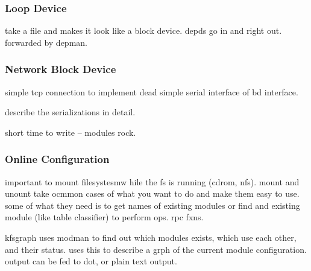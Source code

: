 \subsubsection{Loop Device}

take a file and makes it look like a block device. depds go in and
right out. forwarded by depman.

\subsubsection{Network Block Device}

simple tcp connection to implement dead simple serial interface of bd
interface.

describe the serializations in detail.

short time to write -- modules rock.

\subsubsection{Online Configuration}

important to mount filesystesmw hile the fs is running (cdrom,
nfs). mount and unount take ocmmon cases of what you want to do and
make them easy to use. some of what they need is to get names of
existing modules or find and existing module (like table classifier)
to perform ops. rpc fxns.

kfsgraph uses modman to find out which modules exists, which use each
other, and their status. uses this to describe a grph of the current
module configuration. output can be fed to dot, or plain text output.

